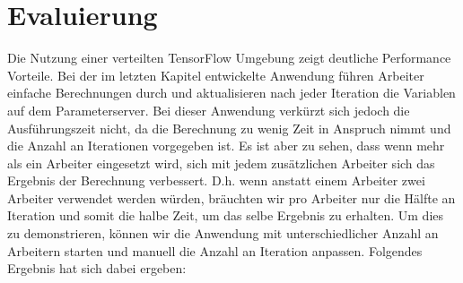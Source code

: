 \section{Evaluierung}
Die Nutzung einer verteilten TensorFlow Umgebung zeigt deutliche Performance Vorteile. Bei der im letzten Kapitel entwickelte Anwendung führen Arbeiter einfache Berechnungen durch und aktualisieren nach jeder Iteration die Variablen auf dem Parameterserver. Bei dieser Anwendung verkürzt sich jedoch die Ausführungszeit nicht, da die Berechnung zu wenig Zeit in Anspruch nimmt und die Anzahl an Iterationen vorgegeben ist. Es ist aber zu sehen, dass wenn mehr als ein Arbeiter eingesetzt wird, sich mit jedem zusätzlichen Arbeiter sich das Ergebnis der Berechnung verbessert. D.h. wenn anstatt einem Arbeiter zwei Arbeiter verwendet werden würden, bräuchten wir pro Arbeiter nur die Hälfte an Iteration und somit die halbe Zeit, um das selbe Ergebnis zu erhalten. Um dies zu demonstrieren, können wir die Anwendung mit  unterschiedlicher Anzahl an Arbeitern starten und manuell die Anzahl an Iteration anpassen. Folgendes Ergebnis hat sich dabei ergeben:


